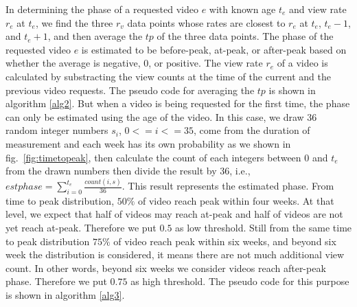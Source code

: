 \documentclass[10pt,final,journal,a4paper]{IEEEtran}
\begin{document}
In determining the phase of a requested video $e$ with known age $t_e$ and view rate $r_e$ at $t_e$, we find the three $r_v$ data points whose rates are closest to $r_e$ at $t_e$, $t_e - 1$, and $t_e + 1$, and then average the $tp$ of the three data points.
The phase of the requested video $e$ is estimated to be before-peak, at-peak, or after-peak based on whether the average is negative, $0$, or positive.
The view rate $r_e$ of a video is calculated by substracting the view counts at the time of the current and the previous video requests.
The pseudo code for averaging the $tp$ is shown in algorithm \ref{alg2}.
But when a video is being requested for the first time, the phase can only be estimated using the age of the video.
In this case, we draw 36 random integer numbers $s_i$, $0 <= i <= 35$, come from the duration of measurement and each week has its own probability as we shown in fig.~\ref{fig:timetopeak}, then calculate the count of each integers between $0$ and $t_e$ from the drawn numbers then divide the result by 36, 
i.e., $estphase = \sum_{i=0}^{t_e} \frac{count(i,s)}{36}$.
This result represents the estimated phase. 
From time to peak distribution, $50\%$ of video reach peak within four weeks. 
At that level, we expect that half of videos may reach at-peak and half of videos are not yet reach at-peak.
Therefore we put $0.5$ as low threshold.  
Still from the same time to peak distribution $75\%$ of video reach peak within six weeks, and beyond six week the distribution is considered, it means there are not much additional view count. 
In other words, beyond six weeks we consider videos reach after-peak phase. 
Therefore we put $0.75$ as high threshold.
The pseudo code for this purpose is shown in algorithm \ref{alg3}.

\end{document}
